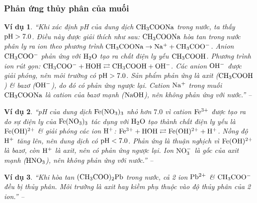 \documentclass[oneside]{book}
\numberwithin{equation}{section}
\newtheorem{vidu}{Ví dụ}[section]
\begin{document}
\subsubsection{Phản ứng thủy phân của muối}

\begin{vidu}
	``Khi xác định pH của dung dịch $\rm CH_3COONa$ trong nước, ta thấy $\rm pH > 7.0$. Điều này được giải thích như sau: $\rm CH_3COONa$ hòa tan trong nước phân ly ra ion theo phương trình $\rm CH_3COONa\to Na^+ + CH_3COO^-$. Anion $\rm CH_3COO^-$ phản ứng với $\rm H_2O$ tạo ra chất điện ly yếu $\rm CH_3COOH$. Phương trình ion rút gọn: $\rm CH_3COO^- + HOH\rightleftarrows CH_3COOH + OH^-$. Các anion $\rm OH^-$ được giải phóng, nên môi trường có $\rm pH > 7.0$. Sản phẩm phản ứng là axit ($\rm CH_3COOH$) \& bazơ ($\rm OH^-$), do đó có phản ứng ngược lại. Cation $\rm Na^+$ trong muối $\rm CH_3COONa$ là cation của bazơ mạnh ($\rm NaOH$), nên không phản ứng với nước.'' -- \cite[p. 27]{SGK_Hoa_Hoc_11_nang_cao}
\end{vidu}

\begin{vidu}
	``pH của dung dịch $\rm Fe(NO_3)_3$ nhỏ hơn $7.0$ vì cation $\rm Fe^{3+}$ được tạo ra do sự điện ly của $\rm Fe(NO_3)_3$ tác dụng với $\rm H_2O$ tạo thành chất điện ly yếu là $\rm Fe(OH)^{2+}$ \& giải phóng các ion $\rm H^+$: $\rm Fe^{3+} + HOH\rightleftarrows Fe(OH)^{2+} + H^+$. Nồng độ $\rm H^+$ tăng lên, nên dung dịch có $\rm pH < 7.0$. Phản ứng là thuận nghịch vì $\rm Fe(OH)^{2+}$ là bazơ, còn $\rm H^+$ là axit, nên có phản ứng ngược lại. Ion $\rm NO_3^-$ là gốc của axit mạnh ($\rm HNO_3$), nên không phản ứng với nước.'' -- \cite[p. 27]{SGK_Hoa_Hoc_11_nang_cao}
\end{vidu}

\begin{vidu}
	``Khi hòa tan $\rm(CH_3COO)_2Pb$ trong nước, cả 2 ion $\rm Pb^{2+}$ \& $\rm CH_3COO^-$ đều bị thủy phân. Môi trường là axit hay kiềm phụ thuộc vào độ thủy phân của 2 ion.'' -- \cite[p. 28]{SGK_Hoa_Hoc_11_nang_cao}
\end{vidu}
\end{document}
